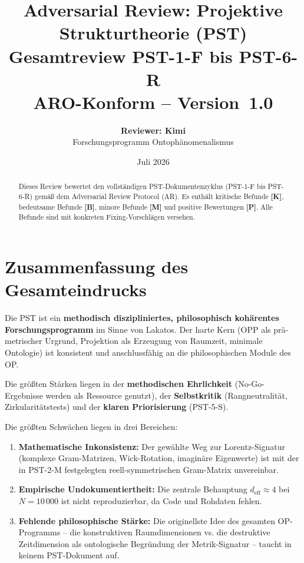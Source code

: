 \documentclass[11pt,a4paper]{article}
\title{
  \textbf{Adversarial Review: Projektive Strukturtheorie (PST)}\\[0.4em]
  {\large Gesamtreview PST-1-F bis PST-6-R}\\[0.5em]
  {\normalsize ARO-Konform -- Version~1.0}
}
\author{
  \textbf{Reviewer: Kimi}\\
  \small Forschungsprogramm Ontoph\"{a}nomenalismus
}
\date{Juli 2026}
\begin{document}
\maketitle

\begin{abstract}
Dieses Review bewertet den vollst\"{a}ndigen PST-Dokumentenzyklus
(PST-1-F bis PST-6-R) gem\"{a}\ss{} dem Adversarial Review Protocol (AR).
Es enth\"{a}lt kritische Befunde \textbf{[K]}, bedeutsame Befunde
\textbf{[B]}, minore Befunde \textbf{[M]} und positive Bewertungen
\textbf{[P]}. Alle Befunde sind mit konkreten Fixing-Vorschl\"{a}gen
versehen.
\end{abstract}

\tableofcontents
\newpage

\section{Zusammenfassung des Gesamteindrucks}

Die PST ist ein \textbf{methodisch diszipliniertes, philosophisch
koh\"{a}rentes Forschungsprogramm} im Sinne von Lakatos. Der harte Kern
(OPP als pr\"{a}-metrischer Urgrund, Projektion als Erzeugung von
Raumzeit, minimale Ontologie) ist konsistent und anschlussf\"{a}hig an
die philosophischen Module des OP.

Die gr\"{o}\ss{}ten St\"{a}rken liegen in der \textbf{methodischen
Ehrlichkeit} (No-Go-Ergebnisse werden als Ressource genutzt), der
\textbf{Selbstkritik} (Rangneutralit\"{a}t, Zirkularit\"{a}tstests) und
der \textbf{klaren Priorisierung} (PST-5-S).

Die gr\"{o}\ss{}ten Schw\"{a}chen liegen in drei Bereichen:
\begin{enumerate}
  \item \textbf{Mathematische Inkonsistenz:} Der gew\"{a}hlte Weg zur
    Lorentz-Signatur (komplexe Gram-Matrizen, Wick-Rotation,
    imagin\"{a}re Eigenwerte) ist mit der in PST-2-M festgelegten
    reell-symmetrischen Gram-Matrix unvereinbar.
  \item \textbf{Empirische Undokumentiertheit:} Die zentrale
    Behauptung $d_{\text{eff}} \approx 4$ bei $N = 10\,000$ ist
    nicht reproduzierbar, da Code und Rohdaten fehlen.
  \item \textbf{Fehlende philosophische St\"{a}rke:} Die originellste
    Idee des gesamten OP-Programms -- die konstruktiven
    Raumdimensionen vs. die destruktive Zeitdimension als
    ontologische Begr\"{u}ndung der Metrik-Signatur -- taucht in
    keinem PST-Dokument auf.
\end{enumerate}
\end{document}
